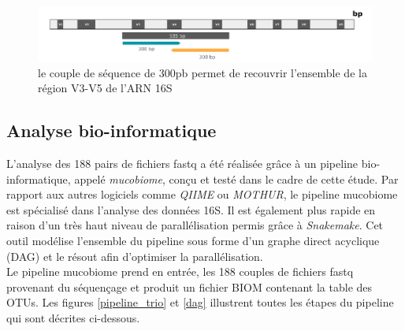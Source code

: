 \documentclass[12pt,a4paper]{article}
\begin{document}
\begin{figure}[ht]
\begin{center}
\includegraphics[scale=0.6]{img/illumina.png}\hfill
\end{center}
\caption{le couple de séquence de 300pb permet de recouvrir l'ensemble de la région V3-V5 de l'ARN 16S}
\label{illumina}
\end{figure}


\subsection{Analyse bio-informatique}
L’analyse des 188 pairs de fichiers fastq a été réalisée grâce à un pipeline bio-informatique, appelé \textit{mucobiome}, conçu et testé dans le cadre de cette étude. Par rapport aux autres logiciels comme \textit{QIIME}\cite{Caporaso2010} ou \textit{MOTHUR}\cite{Schloss2009}, le pipeline mucobiome est spécialisé dans l’analyse des données 16S. Il est également plus rapide en raison d’un très haut niveau de parallélisation permis grâce à  \textit{Snakemake}\cite{Koster2012}. Cet outil modélise l'ensemble du pipeline sous forme d'un graphe direct acyclique (DAG) et le résout afin d'optimiser la parallélisation. \\
Le pipeline mucobiome prend en entrée, les 188 couples de fichiers fastq provenant du séquençage et produit un fichier BIOM contenant la table des OTUs. Les figures \ref{pipeline_trio} et \ref{dag} illustrent toutes les étapes du pipeline qui sont décrites ci-dessous.
\end{document}
